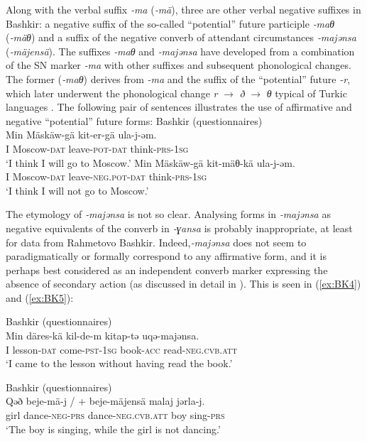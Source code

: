 \documentclass[output=paper,draft,draftmode,colorlinks,citecolor=brown]{langscibook}
\begin{document}
Along with the verbal suffix \textit{‑ma} (\textit{‑mä}), three are other verbal negative suffixes in Bashkir: a negative suffix of the so-called “potential” future \citep[148]{dmitriev1948a} participle \textit{‑maθ} (\textit{‑mäθ}) and a suffix of the negative converb of attendant circumstances \textit{‑majənsa} (\textit{‑mäjensä}). The suffixes \textit{‑maθ} and \textit{‑majənsa} have developed from a combination of the SN marker \textit{‑ma} with other suffixes and subsequent phonological changes. The former (\textit{‑maθ}) derives from \textit{-ma} and the suffix of the “potential” future \textit{-r}, which later underwent the phonological change \textit{r} $\rightarrow$ \textit{ð} $\rightarrow$ \textit{θ} typical of Turkic languages \citep[149]{dmitriev1948a}. The following pair of sentences illustrates the use of affirmative and negative “potential” future forms:
\newpage
\ea Bashkir (questionnaires) \label{ex:BK3}\\
  \ea
	\gll Min	Mäskäw-gä		kit-er-gä			ula-j-əm.\\
	I		Moscow-\textsc{dat}	leave-\textsc{pot-dat}	think-\textsc{prs-1sg}\\
	\glt `I think I will go to Moscow.'
  \ex
	\gll Min	Mäskäw-gä		kit-mäθ-kä				ula-j-əm.\\
	I		Moscow-\textsc{dat}	leave-\textsc{neg.pot-dat}	think-\textsc{prs-1sg}\\
	\glt `I think I will not go to Moscow.'
\z \z

The etymology of \textit{‑majənsa} is not so clear. Analysing forms in \textit{‑majənsa} as negative equivalents of the converb in \textit{‑ɣansa} \citep[188]{dmitriev1948a} is probably inappropriate, at least for data from Rahmetovo Bashkir. Indeed,\textit{‑majənsa} does not seem to paradigmatically or formally correspond to any affirmative form, and it is perhaps best considered as an independent converb marker expressing the absence of secondary action (as discussed in detail in \citealp{mishchenko2011a}). This is seen in (\ref{ex:BK4}) and (\ref{ex:BK5}):

\ea Bashkir (questionnaires) \label{ex:BK4}\\
	\gll Min	däres-kä		kil-de-m			kitap-tǝ    uqə-majənsa.\\
	I		lesson-\textsc{dat}	come-\textsc{pst-1sg}	book-\textsc{acc}    read-\textsc{neg.cvb.att}\\
	\glt `I came to the lesson without having read the book.'
\z

\ea Bashkir (questionnaires) \label{ex:BK5}\\
	\gll Qəð	beje-mä-j			{/ + beje-mäjensä}		malaj	jərla-j.\\
	girl		dance-\textsc{neg-prs}	dance-\textsc{neg.cvb.att}	boy	sing-\textsc{prs}\\
	\glt `The boy is singing, while the girl is not dancing.'
\z
\end{document}
